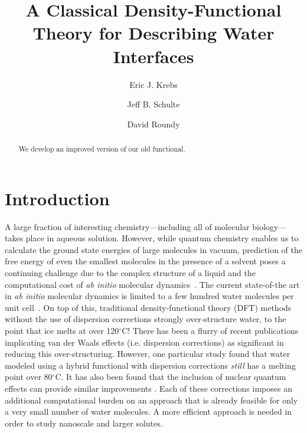 \documentclass[twocolumn,amsmath,amssymb,prb]{revtex4-1}
\begin{document}
\title{A Classical Density-Functional Theory for Describing Water Interfaces}

\author{Eric J. Krebs}
\author{Jeff B. Schulte}
\author{David Roundy}

\begin{abstract}
We develop an improved version of our old functional.
\end{abstract}
\maketitle

\section{Introduction}

A large fraction of interesting chemistry---including all of molecular
biology---takes place in aqueous solution.  However, while quantum
chemistry enables us to calculate the ground state energies of large
molecules in vacuum, prediction of the free energy of even the
smallest molecules in the presence of a solvent poses a continuing
challenge due to the complex structure of a liquid and the
computational cost of \emph{ab initio} molecular
dynamics~\cite{car1985, grossman2004}.  The current state-of-the art
in \emph{ab initio} molecular dynamics is limited to a few hundred
water molecules per unit cell~\cite{lewis2011doesnitric}.
%
On top of this, traditional density-functional theory (DFT) methods
without the use of dispersion corrections strongly over-structure
water, to the point that ice melts at over 120$^\circ$C\cite{yoo2009phase}!
%
There has been a flurry of recent
publications implicating van der Waals effects (i.e. dispersion
corrections) as significant in
reducing this over-structuring\cite{lin2009importance,
  wang2011density, mogelhoj2011ab, jonchiere2011van}.
%
However, one particular study found that water modeled using a
hybrid functional with dispersion corrections \emph{still} has a
melting point over 80$^\circ$C\cite{yoo2011}.
%
It has also
been found that the inclusion of nuclear quantum effects can provide
similar improvements \cite{morrone2008nuclear}.  Each of these
corrections imposes an additional computational burden on an approach
that is already feasible for only a very small number of water
molecules. A more efficient approach is needed in order to study
nanoscale and larger solutes.
\end{document}
